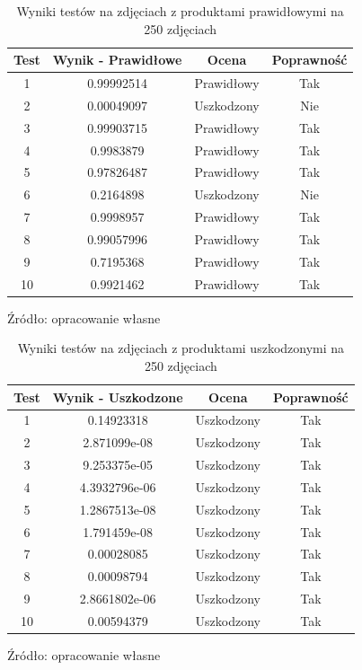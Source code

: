 \begin{table}[H]
\centering
\caption{Wyniki testów na zdjęciach z produktami prawidłowymi na 250 zdjęciach}
\begin{tabular}{|c|c|c|c|}
\hline
\textbf{Test} & \textbf{Wynik - Prawidłowe} & \textbf{Ocena} & \textbf{Poprawność} \\ \hline
1  & 0.99992514 & Prawidłowy & Tak \\ \hline
2  & 0.00049097 & Uszkodzony & Nie \\ \hline
3  & 0.99903715 & Prawidłowy & Tak \\ \hline
4  & 0.9983879 & Prawidłowy & Tak \\ \hline
5  & 0.97826487 & Prawidłowy & Tak \\ \hline
6  & 0.2164898 & Uszkodzony & Nie \\ \hline
7  & 0.9998957 & Prawidłowy & Tak \\ \hline
8  & 0.99057996 & Prawidłowy & Tak \\ \hline
9  & 0.7195368 & Prawidłowy & Tak \\ \hline
10  & 0.9921462 & Prawidłowy & Tak \\ \hline
\end{tabular}
\begin{center}
\footnotesize{Źródło: opracowanie własne}
\end{center}
\label{tab:test_results_prawidlowe_250}
\end{table}

\begin{table}[H]
\centering
\caption{Wyniki testów na zdjęciach z produktami uszkodzonymi na 250 zdjęciach}
\begin{tabular}{|c|c|c|c|}
\hline
\textbf{Test} & \textbf{Wynik - Uszkodzone} & \textbf{Ocena} & \textbf{Poprawność} \\ \hline
1  & 0.14923318 & Uszkodzony & Tak \\ \hline
2  & 2.871099e-08 & Uszkodzony & Tak \\ \hline
3  & 9.253375e-05 & Uszkodzony & Tak \\ \hline
4  & 4.3932796e-06 & Uszkodzony & Tak \\ \hline
5  & 1.2867513e-08 & Uszkodzony & Tak \\ \hline
6  & 1.791459e-08 & Uszkodzony & Tak \\ \hline
7  & 0.00028085 & Uszkodzony & Tak \\ \hline
8  & 0.00098794 & Uszkodzony & Tak \\ \hline
9  & 2.8661802e-06 & Uszkodzony & Tak \\ \hline
10  & 0.00594379 & Uszkodzony & Tak \\ \hline
\end{tabular}
\begin{center}
\footnotesize{Źródło: opracowanie własne}
\end{center}
\label{tab:test_results_uszkodzone_250}
\end{table}

